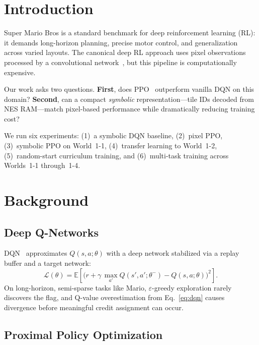\documentclass[10pt,a4paper,twocolumn]{article}
\begin{document}
\section{Introduction}

Super Mario Bros is a standard benchmark for deep reinforcement learning
(RL): it demands long-horizon planning, precise motor control, and
generalization across varied layouts.
The canonical deep RL approach uses pixel observations processed by a
convolutional network~\cite{mnih2015human}, but this pipeline is
computationally expensive.

Our work asks two questions.
\textbf{First}, does PPO~\cite{schulman2017proximal} outperform vanilla DQN
on this domain?
\textbf{Second}, can a compact \emph{symbolic} representation---tile IDs
decoded from NES RAM---match pixel-based performance while dramatically
reducing training cost?

We run six experiments: (1)~a symbolic DQN baseline, (2)~pixel PPO,
(3)~symbolic PPO on World~1-1, (4)~transfer learning to World~1-2,
(5)~random-start curriculum training, and (6)~multi-task training across
Worlds~1-1 through~1-4.

\section{Background}

\subsection{Deep Q-Networks}

DQN~\cite{mnih2015human} approximates $Q(s,a;\theta)$ with a deep network
stabilized via a replay buffer and a target network:
\begin{equation}
  \mathcal{L}(\theta) = \mathbb{E}\!\left[\bigl(r + \gamma\,\max_{a'}Q(s',a';\theta^{-}) - Q(s,a;\theta)\bigr)^2\right].
  \label{eq:dqn}
\end{equation}
On long-horizon, semi-sparse tasks like Mario, $\varepsilon$-greedy
exploration rarely discovers the flag, and Q-value overestimation from
Eq.~\eqref{eq:dqn} causes divergence before meaningful credit assignment
can occur.

\subsection{Proximal Policy Optimization}
\end{document}

